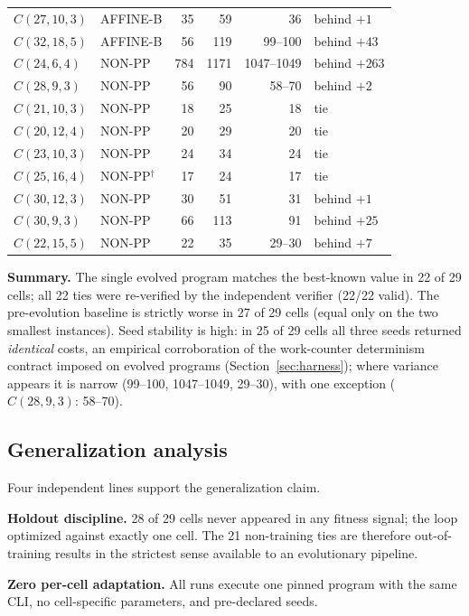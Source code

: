 \begin{table}
\begin{tabular}{llrrrl}
$C(27,10,3)$ & AFFINE-B & 35       & 59    & 36    & behind $+1$ \\
$C(32,18,5)$ & AFFINE-B & 56       & 119   & 99--100 & behind $+43$ \\
$C(24,6,4)$  & NON-PP   & 784      & 1171  & 1047--1049 & behind $+263$ \\
$C(28,9,3)$  & NON-PP   & 56       & 90    & 58--70 & behind $+2$ \\
$C(21,10,3)$ & NON-PP   & 18       & 25    & 18    & tie \\
$C(20,12,4)$ & NON-PP   & 20       & 29    & 20    & tie \\
$C(23,10,3)$ & NON-PP   & 24       & 34    & 24    & tie \\
$C(25,16,4)$ & NON-PP$^{\dagger}$ & 17 & 24 & 17   & tie \\
$C(30,12,3)$ & NON-PP   & 30       & 51    & 31    & behind $+1$ \\
$C(30,9,3)$  & NON-PP   & 66       & 113   & 91    & behind $+25$ \\
$C(22,15,5)$ & NON-PP   & 22       & 35    & 29--30 & behind $+7$ \\
\bottomrule
\end{tabular}
\end{table}

\textbf{Summary.} The single evolved program matches the best-known
value in 22 of 29 cells; all 22 ties were re-verified by the
independent verifier (22/22 valid). The pre-evolution baseline is
strictly worse in 27 of 29 cells (equal only on the two smallest
instances). Seed stability is high: in 25 of 29 cells all three
seeds returned \emph{identical} costs, an empirical corroboration of
the work-counter determinism contract imposed on evolved programs
(Section~\ref{sec:harness}); where variance appears it is narrow
(99--100, 1047--1049, 29--30), with one exception ($C(28,9,3)$:
58--70).

\subsection{Generalization analysis}

Four independent lines support the generalization claim.

\textbf{Holdout discipline.} 28 of 29 cells never appeared in any
fitness signal; the loop optimized against exactly one cell. The 21
non-training ties are therefore out-of-training results in the
strictest sense available to an evolutionary pipeline.

\textbf{Zero per-cell adaptation.} All runs execute one pinned
program with the same CLI, no cell-specific parameters, and
pre-declared seeds.

